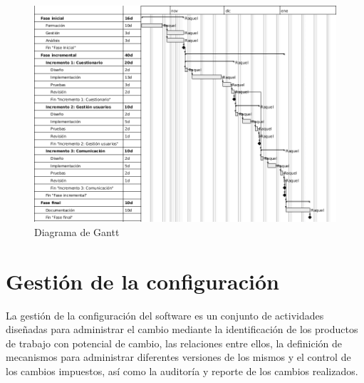 \begin{landscape}

\begin{figure}[htbp] 
    \centering
    \includegraphics[height=\textwidth,keepaspectratio]{figuras/gantt_v2_en.png}
    \caption{Diagrama de Gantt}
    \label{fig:gantt}
\end{figure}	

\end{landscape}


\section{Gestión de la configuración}
La gestión de la configuración del software es un conjunto de actividades diseñadas para administrar el cambio mediante la identificación de los productos de trabajo con potencial de cambio, las relaciones entre ellos, la definición de mecanismos para administrar diferentes versiones de los mismos y el control de los cambios impuestos, así como la auditoría y reporte de los cambios realizados\cite{pressman}.

